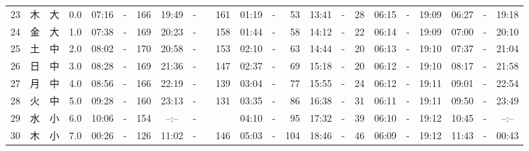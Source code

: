 \documentclass[12pt,a4j]{jsarticle}
\begin{document}
\begin{table}[htbp]
\begin{center}
{\begin{tabular}{|rc|cr|ccrccr|ccrccr|ccc|ccc|}
23 & 木 & 大 &  0.0 &  07:16 &-& 166 &  19:49 &-& 161 &  01:19 &-&  53 &  13:41 &-&  28 & 06:15 & -& 19:09 & 06:27 & -& 19:18 \\
24 & 金 & 大 &  1.0 &  07:38 &-& 169 &  20:23 &-& 158 &  01:44 &-&  58 &  14:12 &-&  22 & 06:14 & -& 19:09 & 07:00 & -& 20:10 \\
25 & 土 & 中 &  2.0 &  08:02 &-& 170 &  20:58 &-& 153 &  02:10 &-&  63 &  14:44 &-&  20 & 06:13 & -& 19:10 & 07:37 & -& 21:04 \\
26 & 日 & 中 &  3.0 &  08:28 &-& 169 &  21:36 &-& 147 &  02:37 &-&  69 &  15:18 &-&  20 & 06:12 & -& 19:10 & 08:17 & -& 21:58 \\
27 & 月 & 中 &  4.0 &  08:56 &-& 166 &  22:19 &-& 139 &  03:04 &-&  77 &  15:55 &-&  24 & 06:12 & -& 19:11 & 09:01 & -& 22:54 \\
28 & 火 & 中 &  5.0 &  09:28 &-& 160 &  23:13 &-& 131 &  03:35 &-&  86 &  16:38 &-&  31 & 06:11 & -& 19:11 & 09:50 & -& 23:49 \\
29 & 水 & 小 &  6.0 &  10:06 &-& 154 &  --:-- &-&~~~~~ &  04:10 &-&  95 &  17:32 &-&  39 & 06:10 & -& 19:12 & 10:45 & -& --:-- \\
30 & 木 & 小 &  7.0 &  00:26 &-& 126 &  11:02 &-& 146 &  05:03 &-& 104 &  18:46 &-&  46 & 06:09 & -& 19:12 & 11:43 & -& 00:43 \\
   \hline
   \end{tabular}}
   \end{center}
\end{table}
\newpage
\end{document}
